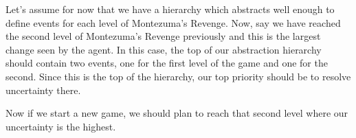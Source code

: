 \documentclass{article}
\begin{document}








Let's assume for now that we have a hierarchy which abstracts well enough to define events for each level of Montezuma's Revenge. Now, say we have reached the second level of Montezuma's Revenge previously and this is the largest change seen by the agent. In this case, the top of our abstraction hierarchy should contain two events, one for the first level of the game and one for the second. Since this is the top of the hierarchy, our top priority should be to resolve uncertainty there.

Now if we start a new game, we should plan to reach that second level where our uncertainty is the highest.
\end{document}
